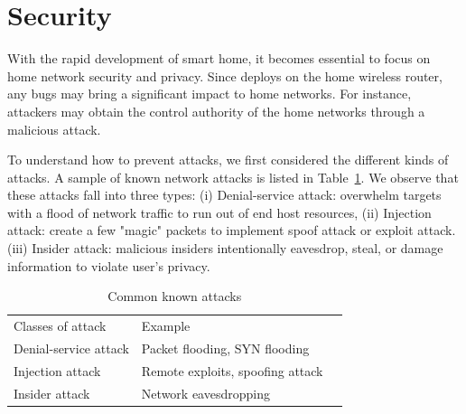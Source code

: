 \section{Security}
With the rapid development of smart home, it becomes essential to focus on home network security and privacy. Since \sysname deploys on the home wireless router, any bugs may bring a significant impact to home networks. For instance, attackers may obtain the control authority of the home networks through a malicious attack. 

To understand how to prevent attacks, we first considered the different kinds of attacks. A sample of known network attacks is listed in Table~\ref{table: attack}. We observe that these attacks fall into three types: (i) Denial-service attack: overwhelm targets with a flood of network traffic to run out of end host resources, (ii) Injection attack: create a few "magic" packets to implement spoof attack or exploit attack. (iii) Insider attack: malicious insiders intentionally eavesdrop, steal, or damage information to violate user's privacy.

\begin{table}[]
\centering
\begin{tabular}{|l|l|l}
\cline{1-2}
Classes of attack     & Example                                 &  \\ \cline{1-2}
Denial-service attack & Packet flooding, SYN flooding\cite{eddy2011syn}             &  \\ \cline{1-2}
Injection attack      & Remote exploits\cite{shellcode},  spoofing attack\cite{bishop1996attack} &  \\ \cline{1-2}
Insider attack        & Network eavesdropping                   &  \\ \cline{1-2}
\end{tabular}
\caption{Common known attacks}
\label{table: attack}
\end{table}

